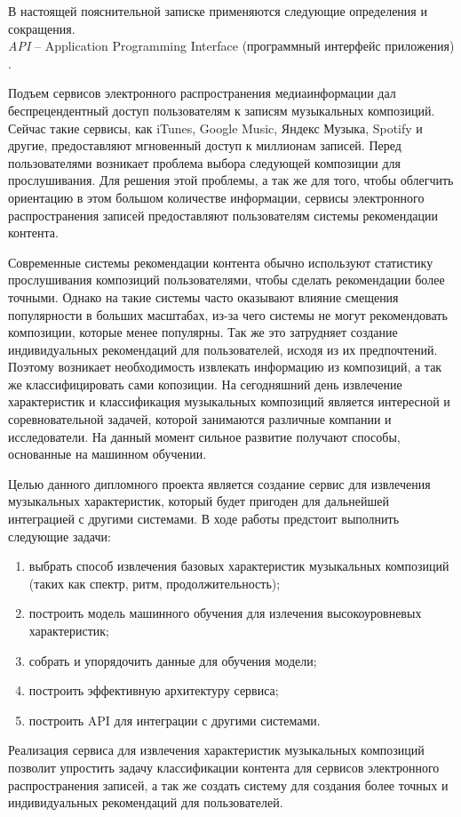 \label{sec:definitions}

В настоящей пояснительной записке применяются следующие определения и сокращения.
\\

\emph{API} -- Application Programming Interface (программный интерфейс приложения) \cite{istqb_specification}.


\label{sec:introduction}


Подъем сервисов электронного распространения медиаинформации дал беспрецендентный доступ пользователям к записям музыкальных композиций. Сейчас такие сервисы, как iTunes, Google Music, Яндекс Музыка, Spotify и другие, предоставляют мгновенный доступ к миллионам записей. Перед пользователями возникает проблема выбора следующей композиции для прослушивания. Для решения этой проблемы, а так же для того, чтобы облегчить ориентацию в этом большом количестве информации, сервисы электронного распространения записей предоставляют пользователям системы рекомендации контента.

Современные системы рекомендации контента обычно используют статистику прослушивания композиций пользователями, чтобы сделать рекомендации более точными. Однако на такие системы часто оказывают влияние смещения популярности в больших масштабах, из-за чего системы не могут рекомендовать композиции, которые менее популярны. Так же это затрудняет создание индивидуальных рекомендаций для пользователей, исходя из их предпочтений. Поэтому возникает необходимость извлекать информацию из композиций, а так же классифицировать сами копозиции. На сегодняшний день извлечение характеристик и классификация музыкальных композиций является интересной и соревновательной задачей, которой занимаются различные компании и исследователи. На данный момент сильное развитие получают способы, основанные на машинном обучении.


Целью данного дипломного проекта является создание сервис для извлечения музыкальных характеристик, который будет пригоден для дальнейшей интеграцией с другими системами. В ходе работы предстоит выполнить следующие задачи:
\begin{enumerate}
  \item выбрать способ извлечения базовых характеристик музыкальных композиций (таких как спектр, ритм, продолжительность);
  \item построить модель машинного обучения для излечения высокоуровневых характеристик;
  \item собрать и упорядочить данные для обучения модели;
  \item построить эффективную архитектуру сервиса;
  \item построить API для интеграции с другими системами.
\end{enumerate}

Реализация сервиса для извлечения характеристик музыкальных композиций позволит упростить задачу классификации контента для сервисов электронного распространения записей, а так же создать систему для создания более точных и индивидуальных рекомендаций для пользователей.
